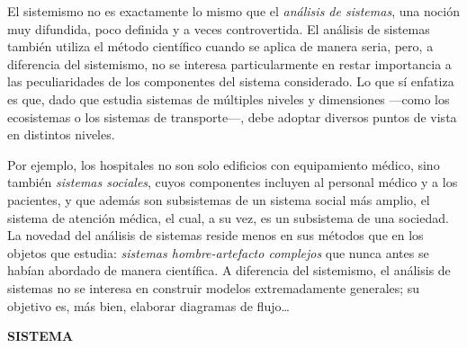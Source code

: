 {El sistemismo no es exactamente lo mismo que el \textit{análisis de sistemas}, una noción muy difundida, poco definida y a veces controvertida. El análisis de sistemas también utiliza el método científico cuando se aplica de manera seria, pero, a diferencia del sistemismo, no se interesa particularmente en restar importancia a las peculiaridades de los componentes del sistema considerado.  
Lo que sí enfatiza es que, dado que estudia sistemas de múltiples niveles y dimensiones —como los ecosistemas o los sistemas de transporte—, debe adoptar diversos puntos de vista en distintos niveles.

Por ejemplo, los hospitales no son solo edificios con equipamiento médico, sino también \textit{sistemas sociales}, cuyos componentes incluyen al personal médico y a los pacientes, y que además son subsistemas de un sistema social más amplio, el sistema de atención médica, el cual, a su vez, es un subsistema de una sociedad.  
La novedad del análisis de sistemas reside menos en sus métodos que en los objetos que estudia: \textit{sistemas hombre-artefacto complejos} que nunca antes se habían abordado de manera científica. A diferencia del sistemismo, el análisis de sistemas no se interesa en construir modelos extremadamente generales; su objetivo es, más bien, elaborar diagramas de flujo\ldots
}

\newpage

\fancyhf{}
\fancyhead[r]{\thepage} 
\begin{center}
{\fontsize{14}{16}\selectfont \textbf{SISTEMA}}\\[0.8cm]
\end{center}

\vspace{0cm}


